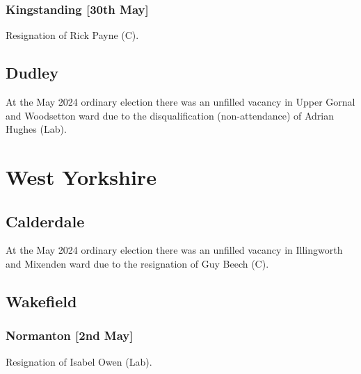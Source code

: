 \documentclass[a4paper,openany]{book}
\begin{document}
\begin{resultsiii}
\subsubsection*{Kingstanding \hspace*{\fill}\nolinebreak[1]%
	\enspace\hspace*{\fill}
	[30th May]}


Resignation of Rick Payne (C).

\subsection*{Dudley}

At the May 2024 ordinary election there was an unfilled vacancy in Upper Gornal and Woodsetton ward due to the disqualification (non-attendance) of Adrian Hughes (Lab).%

\section{West Yorkshire}

\subsection*{Calderdale}

At the May 2024 ordinary election there was an unfilled vacancy in Illingworth and Mixenden ward due to the resignation of Guy Beech (C).%

\subsection*{Wakefield}

\subsubsection*{Normanton \hspace*{\fill}\nolinebreak[1]%
	\enspace\hspace*{\fill}
	[2nd May]}


Resignation of Isabel Owen (Lab).


\end{resultsiii}
\end{document}
